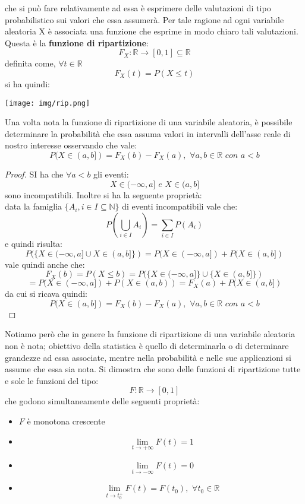 \documentclass[a4paper,12pt, oneside]{book}
\begin{document}
che si può fare relativamente ad essa è esprimere delle valutazioni di tipo
probabilistico sui valori che essa assumerà.
Per tale ragione ad ogni variabile aleatoria X è associata una funzione che esprime in
modo chiaro tali valutazioni. Questa è la \textbf{funzione di ripartizione}:
\[F_X:\mathbb{R}\to[0,1]\subseteq \mathbb{R}\]
definita come, $\forall t \in\mathbb{R}$
\[F_X(t)=P(X\leq t)\]
si ha quindi:
\begin{center}
\texttt{[image: img/rip.png]}
\end{center}
Una volta nota la funzione di ripartizione di una variabile aleatoria, è possibile determinare la probabilità che essa assuma valori in intervalli dell'asse reale di nostro
interesse osservando che vale:
\[P(X\in(a,b])=F_X(b)-F_X(a),\,\,\forall a,b\in\mathbb{R}\,\,con\,\,a<b\]
\begin{proof}
SI ha che $\forall a<b$ gli eventi:
\[X\in(-\infty,a]\,\,e\,\,X\in (a,b]\]
sono incompatibili. Inoltre si ha la seguente proprietà:
\\ data la famiglia $\{A_i,i\in I\subseteq \mathbb{N}\}$ di eventi incompatibili vale che:
\[P\left(\bigcup_{i\in I} A_i\right)=\sum_{i\in I}P(A_i)\]
e quindi risulta:
\[P(\{X\in(-\infty,a]\cup X\in (a,b]\})=P(X\in(-\infty,a])+P(X\in (a,b])\]
vale quindi anche che:
\[F_X(b)=P(X\leq b)=P(\{X\in(-\infty,a]\}\cup\{X\in(a,b]\})\]
\[= P(X\in(-\infty,a])+P(X\in(a,b))=F_X(a)+P(X\in(a,b])\]
da cui si ricava quindi:
\[P(X\in(a,b])=F_X(b)-F_X(a),\,\,\forall a,b\in\mathbb{R}\,\,con\,\,a<b\]
\end{proof}
Notiamo però che in genere la funzione di ripartizione di una variabile aleatoria non è nota; obiettivo della statistica è quello di determinarla o di determinare grandezze ad essa associate, mentre nella probabilità e nelle sue applicazioni si assume che essa sia nota. Si dimostra che sono delle funzioni di ripartizione tutte e sole le funzioni del tipo:
\[F:\mathbb{R}\to[0,1]\]
che godono simultaneamente delle seguenti proprietà:
\begin{itemize}
\item $F$ è monotona crescente
\item \[\lim_{t\to+\infty} F(t)=1\]
\item \[\lim_{t\to-\infty} F(t)=0\]
\item \[\lim_{t\to t_0^+} F(t)=F(t_0),\,\,\forall t_0\in\mathbb{R}\]
\end{itemize}
\end{document}

